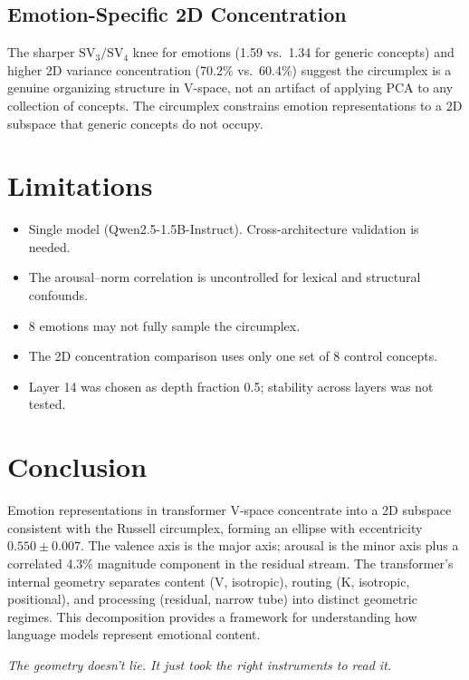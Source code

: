 \documentclass[11pt,a4paper]{article}
\begin{document}
\subsection{Emotion-Specific 2D Concentration}

The sharper $\text{SV}_3/\text{SV}_4$ knee for emotions (1.59 vs.\ 1.34 for generic concepts) and higher 2D variance concentration (70.2\% vs.\ 60.4\%) suggest the circumplex is a genuine organizing structure in V-space, not an artifact of applying PCA to any collection of concepts. The circumplex constrains emotion representations to a 2D subspace that generic concepts do not occupy.

\section{Limitations}

\begin{itemize}
    \item Single model (Qwen2.5-1.5B-Instruct). Cross-architecture validation is needed.
    \item The arousal--norm correlation is uncontrolled for lexical and structural confounds.
    \item 8 emotions may not fully sample the circumplex.
    \item The 2D concentration comparison uses only one set of 8 control concepts.
    \item Layer 14 was chosen as depth fraction 0.5; stability across layers was not tested.
\end{itemize}

\section{Conclusion}

Emotion representations in transformer V-space concentrate into a 2D subspace consistent with the Russell circumplex, forming an ellipse with eccentricity $0.550 \pm 0.007$. The valence axis is the major axis; arousal is the minor axis plus a correlated 4.3\% magnitude component in the residual stream. The transformer's internal geometry separates content (V, isotropic), routing (K, isotropic, positional), and processing (residual, narrow tube) into distinct geometric regimes. This decomposition provides a framework for understanding how language models represent emotional content.

\vspace{1em}
\noindent\textit{The geometry doesn't lie. It just took the right instruments to read it.}
\end{document}
